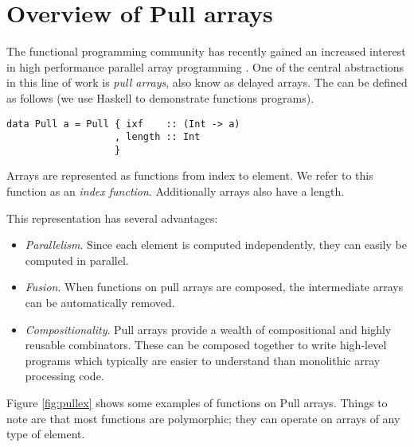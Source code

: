 \documentclass[preprint]{sigplanconf}
\begin{document}
\section{Overview of Pull arrays}
\label{sec:pull}

The functional programming community has recently gained an increased
interest in high performance parallel array programming
\cite{keller2010regular,Axelsson:2010:Feldspar,Mainland:2010:Nikola,Svensson:2011:Obsidian,Claessen:2012:Expressive,Ankner:2013:AnEDSL,lippmeier2011efficient}. One
of the central abstractions in this line of work is \emph{pull
 arrays}, also know as delayed arrays. The can be defined as follows
(we use Haskell \cite{marlow2010haskell} to demonstrate functions
programs).

\begin{small}
\begin{Verbatim}
data Pull a = Pull { ixf    :: (Int -> a)
                   , length :: Int
                   }
\end{Verbatim}
\end{small}

Arrays are represented as functions from index to element. We refer to
this function as an \emph{index function}. Additionally arrays also
have a length.

This representation has several advantages:
\begin{itemize}
\item \emph{Parallelism}. Since each element is computed
  independently, they can easily be computed in parallel.
\item \emph{Fusion}. When functions on pull arrays are composed, the intermediate
  arrays can be automatically removed. 
\item \emph{Compositionality}. Pull arrays provide a wealth of
  compositional and highly reusable combinators. These can be composed
  together to write high-level programs which typically are easier to
  understand than monolithic array processing code.
\end{itemize}

Figure \ref{fig:pullex} shows some examples of functions on Pull
arrays. Things to note are that most functions are polymorphic; they
can operate on arrays of any type of element.
\end{document}
